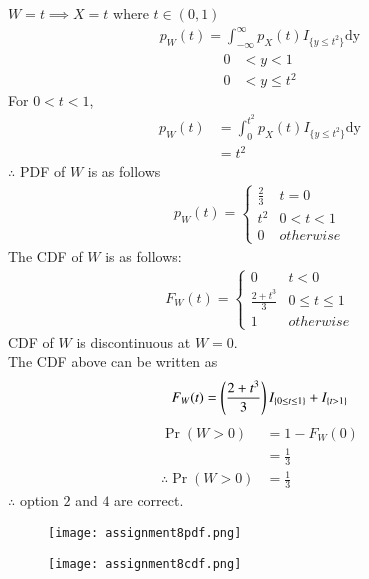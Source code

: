 \documentclass[journal,12pt,twocolumn]{IEEEtran}
\begin{document}
$W=t \implies X=t $ where $t \in (0,1)$
\begin{align}
p_{W}(t) = \int_{- \infty}^{\infty} p_X(t)I_{\{y\leq t^2\}} \mathrm{dy}
\end{align}
\begin{align}
   0 &< y < 1 \label{16} \\
   0 &< y \leq t^2  \label{17}
\end{align}
For $ 0 < t < 1 $,
\begin{align}
p_W(t) &= \int_{0}^{t^2} p_X(t)I_{\{y\leq t^2\}} \mathrm{dy} \\
       &= t^2 \label{18}
\end{align}
$\therefore$ PDF of $W$ is as follows
\begin{align}
p_{W}(t)  = 
\begin{cases}
  \frac{2}{3}& t=0 \\
  t^2 & 0 < t < 1 \\
  0 & otherwise
\end{cases} \label{19}
\end{align}
The CDF  of $W$ is as follows:
\begin{align}
F_W(t)  = 
\begin{cases}
  0 & t<0 \\
  \frac{2+t^3}{3}& 0 \leq t\leq 1\\
  1 & otherwise
\end{cases} \label{20}
\end{align}
CDF of $W$ is discontinuous at $W=0$.\\
The CDF above can be written as
\begin{align}
  F_W(t)=\left(\frac{2+t^3}{3}\right)I_{\{0\leq t \leq 1\}}+ I_{\{t > 1\}}
\end{align}
\begin{align}
\Pr(W > 0)&= 1- F_W(0) \\
           &=\frac{1}{3} \label{21} \\
\therefore \Pr(W>0)&=\frac{1}{3}
\end{align}
$\therefore$ option $2$ and $4$ are correct.
\begin{figure}[htb!]
\begin{center}
\texttt{[image: assignment8pdf.png]}
\end{center}
\end{figure}

\begin{figure}[htb!]
\begin{center}
\texttt{[image: assignment8cdf.png]}
\end{center}
\end{figure}
\end{document}
